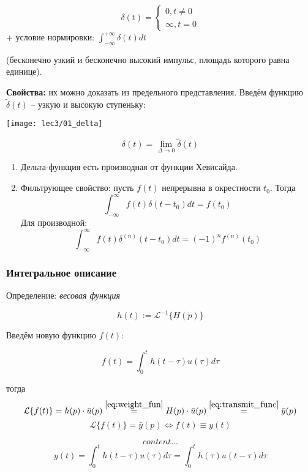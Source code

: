\documentclass[main.tex]{subfiles}
\begin{document}
$$ \delta(t) = \begin{cases}
	0, t \ne 0 \\
	\infty, t = 0
 \end{cases} $$
+ условие нормировки: $ \int_{- \infty}^{+ \infty} \delta(t) dt $

(бесконечно узкий и бесконечно высокий импульс, площадь которого равна единице).

\textbf{Свойства:}
их можно доказать из предельного представления.
Введём функцию $ \tilde \delta (t) $ -- узкую и высокую ступеньку:

\texttt{[image: lec3/01\_delta]}

\[ \delta(t) = \lim_{\Delta \to 0} \tilde \delta(t) \]


\begin{enumerate}[noitemsep]
	\item Дельта-функция есть производная от функции Хевисайда.
	\item Фильтрующее свойство:
    пусть $ f(t) $ непрерывна в окрестности $ t_0 $.
    Тогда
    \[ \int_{-\infty}^{\infty} f(t) \delta(t-t_0) dt = f(t_0)  \]
    Для производной:
    \[ \int_{-\infty}^{\infty} f(t) \delta^{(n)}(t-t_0) dt = (-1)^n f^{(n)}(t_0) \]
\end{enumerate}

\subsubsection{ Интегральное описание }

Определение: \emph{ весовая функция }

\begin{equation} \label{eq:weight_fun}
    h(t) := \mathcal{L}^{-1}\{ H(p) \}
\end{equation}

Введём новую функцию $ f(t) $:

$$ f(t) = \int_0^t h(t - \tau) u(\tau) d \tau $$

тогда
\[ \mathcal{L}\{ f(t) \} = \bar h(p) \cdot \bar u(p) \overset{\eqref{eq:weight_fun}}= H(p) \cdot \bar u(p) \overset{\eqref{eq:transmit_func}}= \bar y(p) \]
\[ \mathcal{L}\{ f(t) \} = \bar y(p) \Leftrightarrow f(t) \equiv y(t) \]

\begin{equation}\label{eq:third_form}
    content...
\end{equation}
$$ y(t) = \int_{0}^{t}h(t - \tau)u(\tau) d\tau = \int_{0}^{t}h(\tau)u(t - \tau) d\tau $$
\end{document}
